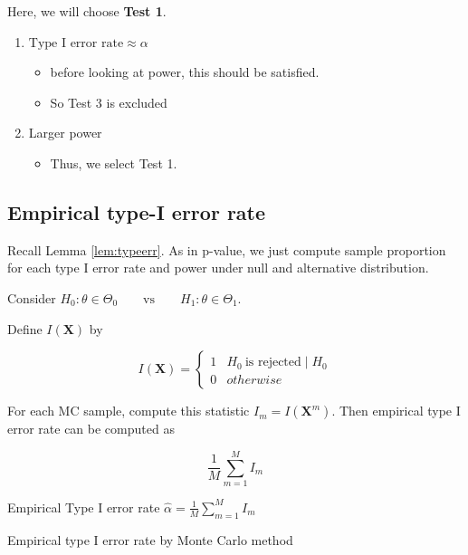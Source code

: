 \documentclass[]{book}
\providecommand{\tightlist}{%
  \setlength{\itemsep}{0pt}\setlength{\parskip}{0pt}}
\theoremstyle{definition}
\theoremstyle{definition}
\theoremstyle{definition}
\theoremstyle{remark}
\let\BeginKnitrBlock\begin \let\EndKnitrBlock\end
\begin{document}
Here, we will choose \textbf{Test 1}.

\begin{enumerate}
\def\labelenumi{\arabic{enumi}.}
\tightlist
\item
  \(\text{Type I error rate} \approx \alpha\)

  \begin{itemize}
  \tightlist
  \item
    before looking at power, this should be satisfied.
  \item
    So Test 3 is excluded
  \end{itemize}
\item
  Larger power

  \begin{itemize}
  \tightlist
  \item
    Thus, we select Test 1.
  \end{itemize}
\end{enumerate}

\hypertarget{empirical-type-i-error-rate}{%
\subsection{Empirical type-I error rate}\label{empirical-type-i-error-rate}}

Recall Lemma \ref{lem:typeerr}. As in p-value, we just compute sample proportion for each type I error rate and power under null and alternative distribution.

\BeginKnitrBlock{lemma}
\protect\hypertarget{lem:testnull}{}{\label{lem:testnull} }Consider \(H_0: \theta \in \Theta_0 \qquad \text{vs} \qquad H_1: \theta \in \Theta_1\).

Define \(I(\mathbf{X})\) by

\[
I(\mathbf{X}) = \begin{cases}
  1 & H_0 \:\text{is rejected} \mid H_0 \\
  0 & otherwise
\end{cases}
\]

For each MC sample, compute this statistic \(I_m = I(\mathbf{X}^{m})\). Then empirical type I error rate can be computed as

\[\frac{1}{M}\sum_{m = 1}^M I_m\]
\EndKnitrBlock{lemma}

\begin{algorithm}[H] \label{alg:algtype1}
  \SetAlgoLined
  Empirical Type I error rate $\hat\alpha = \frac{1}{M}\sum\limits_{m = 1}^M I_m$\;
  \caption{Empirical type I error rate by Monte Carlo method}
\end{algorithm}
\end{document}
